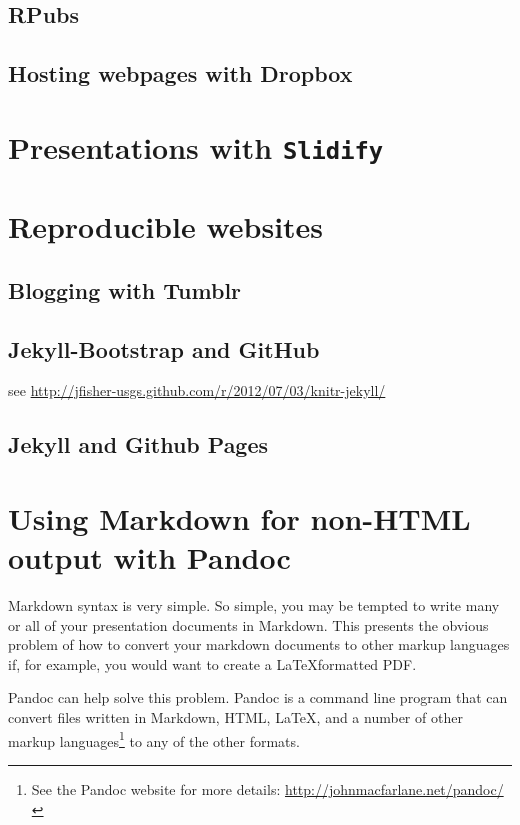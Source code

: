 \documentclass[ChapterTOCs,krantz1]{krantz}\usepackage{graphicx, color}
\begin{document}
\subsection{RPubs}

\subsection{Hosting webpages with Dropbox}

\section{Presentations with \texttt{Slidify}}

\section{Reproducible websites}

\subsection{Blogging with Tumblr}

\subsection{Jekyll-Bootstrap and GitHub}

see \url{http://jfisher-usgs.github.com/r/2012/07/03/knitr-jekyll/}

\subsection{Jekyll and Github Pages}

\section{Using Markdown for non-HTML output with Pandoc}

Markdown syntax is very simple. So simple, you may be tempted to write many or all of your presentation documents in Markdown. This presents the obvious problem of how to convert your markdown documents to other markup languages if, for example, you would want to create a \LaTeX formatted PDF. 

Pandoc can help solve this problem. Pandoc is a command line program that can convert files written in Markdown, HTML, \LaTeX, and a number of other markup languages\footnote{See the Pandoc website for more details: {\url{http://johnmacfarlane.net/pandoc/}}} to any of the other formats. 
\end{document}
